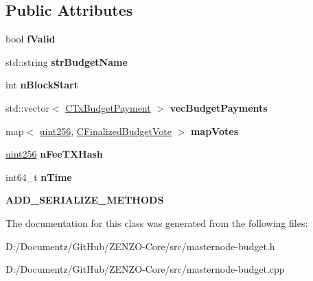 \subsection*{Public Attributes}
\begin{DoxyCompactItemize}
\item 
\mbox{\label{class_c_finalized_budget_a00d9e3055bebaaef28543bd67e4ca162}} 
bool {\bfseries f\+Valid}
\item 
\mbox{\label{class_c_finalized_budget_ae2a467abad2985ff3c32b29fc75500aa}} 
std\+::string {\bfseries str\+Budget\+Name}
\item 
\mbox{\label{class_c_finalized_budget_a1d04c262e10f4588b17eb3aba5ed9b52}} 
int {\bfseries n\+Block\+Start}
\item 
\mbox{\label{class_c_finalized_budget_a639e7be9254d99deb42aeeb15de63174}} 
std\+::vector$<$ \mbox{\hyperlink{class_c_tx_budget_payment}{C\+Tx\+Budget\+Payment}} $>$ {\bfseries vec\+Budget\+Payments}
\item 
\mbox{\label{class_c_finalized_budget_a756460095ed59fd39e7f3018b4b208dd}} 
map$<$ \mbox{\hyperlink{classuint256}{uint256}}, \mbox{\hyperlink{class_c_finalized_budget_vote}{C\+Finalized\+Budget\+Vote}} $>$ {\bfseries map\+Votes}
\item 
\mbox{\label{class_c_finalized_budget_a699a2f3cbea723957c2a944b08484bb5}} 
\mbox{\hyperlink{classuint256}{uint256}} {\bfseries n\+Fee\+T\+X\+Hash}
\item 
\mbox{\label{class_c_finalized_budget_a3bb3cb1d44021d5ef9996a81f3e09734}} 
int64\+\_\+t {\bfseries n\+Time}
\item 
\mbox{\label{class_c_finalized_budget_ad426a5e67867bcb8f73df4aef50ac588}} 
{\bfseries A\+D\+D\+\_\+\+S\+E\+R\+I\+A\+L\+I\+Z\+E\+\_\+\+M\+E\+T\+H\+O\+DS}
\end{DoxyCompactItemize}


The documentation for this class was generated from the following files\+:\begin{DoxyCompactItemize}
\item 
D\+:/\+Documentz/\+Git\+Hub/\+Z\+E\+N\+Z\+O-\/\+Core/src/masternode-\/budget.\+h\item 
D\+:/\+Documentz/\+Git\+Hub/\+Z\+E\+N\+Z\+O-\/\+Core/src/masternode-\/budget.\+cpp\end{DoxyCompactItemize}
